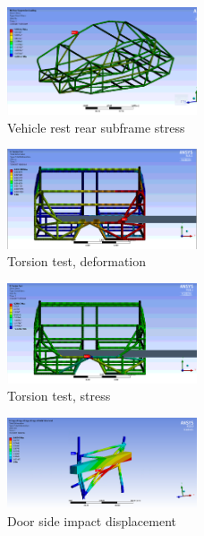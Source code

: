 \documentclass[10pt]{article}
\begin{document}
\begin{figure}[H]
\centering
\includegraphics[width=0.5\textwidth]{figures/fea/chassis/chassis-rear-suspension-stress}
\caption{Vehicle rest rear subframe stress}
\label{fig:chassis-rear-suspension-stress}
\end{figure}

\begin{figure}[H]
\centering
\includegraphics[width=0.5\textwidth]{figures/fea/chassis/torsion-deformation}
\caption{Torsion test, deformation}
\label{fig:torsion-deformation}
\end{figure}

\begin{figure}[H]
\centering
\includegraphics[width=0.5\textwidth]{figures/fea/chassis/torsion-stress}
\caption{Torsion test, stress}
\label{fig:torsion-stress}
\end{figure}

\begin{figure}[H]
\centering
\includegraphics[width=0.5\textwidth]{figures/fea/chassis/door-displacement}
\caption{Door side impact displacement}
\label{fig:door-displacement}
\end{figure}
\end{document}
